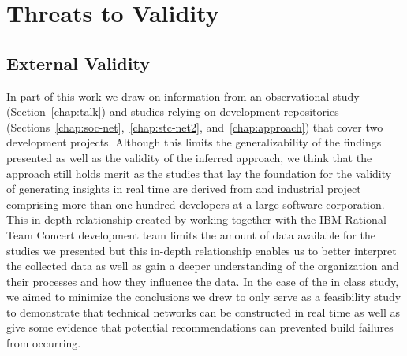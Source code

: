 


\section{Threats to Validity}
\label{sec:threat}
\subsection{External Validity}
In part of this work we draw on information from an observational study (Section~\ref{chap:talk}) and studies relying on development repositories (Sections~\ref{chap:soc-net},~\ref{chap:stc-net2}, and~\ref{chap:approach}) that cover two development projects.
Although this limits the generalizability of the findings presented as well as the validity of the inferred approach, we think that the approach still holds merit as the studies that lay the foundation for the validity of generating insights in real time are derived from and industrial project comprising more than one hundred developers at a large software corporation.
This in-depth relationship created by working together with the IBM Rational Team Concert development team limits the amount of data available for the studies we presented but this in-depth relationship enables us to better interpret the collected data as well as gain a deeper understanding of the organization and their processes and how they influence the data.
In the case of the in class study, we aimed to minimize the conclusions we drew to only serve as a feasibility study to demonstrate that technical networks can be constructed in real time as well as give some evidence that potential recommendations can prevented build failures from occurring.

